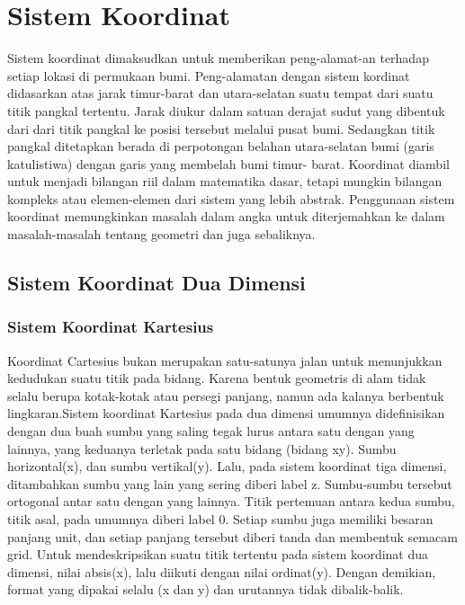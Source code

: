 \section{Sistem Koordinat}

Sistem koordinat dimaksudkan untuk memberikan peng-alamat-an terhadap setiap lokasi di permukaan bumi. Peng-alamatan dengan sistem kordinat didasarkan atas jarak timur-barat dan utara-selatan suatu tempat dari suatu titik pangkal tertentu. Jarak diukur dalam satuan derajat sudut yang dibentuk dari dari titik pangkal ke posisi tersebut melalui pusat bumi. Sedangkan titik pangkal ditetapkan berada di
perpotongan belahan utara-selatan bumi (garis katulistiwa) dengan garis yang membelah bumi timur- barat\cite{zuhdi2012sistem}. Koordinat diambil untuk menjadi bilangan riil dalam matematika dasar, tetapi mungkin bilangan kompleks atau elemen-elemen dari sistem yang lebih abstrak. Penggunaan sistem koordinat memungkinkan masalah dalam angka untuk diterjemahkan ke dalam masalah-masalah tentang geometri dan juga sebaliknya.

\subsection{Sistem Koordinat Dua Dimensi}
\subsubsection{Sistem Koordinat Kartesius}
Koordinat Cartesius bukan merupakan satu-satunya jalan untuk menunjukkan kedudukan suatu titik pada bidang. Karena bentuk geometris di alam tidak selalu berupa kotak-kotak atau persegi panjang, namun ada kalanya berbentuk lingkaran\cite{mufidah2015solusi}.Sistem koordinat Kartesius pada dua dimensi umumnya didefinisikan dengan dua buah sumbu yang saling tegak lurus antara satu dengan yang lainnya, yang keduanya terletak pada satu bidang (bidang xy). Sumbu horizontal(x), dan sumbu vertikal(y). Lalu, pada sistem koordinat tiga dimensi, ditambahkan sumbu yang lain yang sering diberi label z. Sumbu-sumbu tersebut ortogonal antar satu dengan yang lainnya. Titik pertemuan antara kedua sumbu, titik asal, pada umumnya diberi label 0. Setiap sumbu juga memiliki besaran panjang unit, dan setiap panjang tersebut diberi tanda dan membentuk semacam grid. Untuk mendeskripsikan suatu titik tertentu pada sistem koordinat dua dimensi, nilai absis(x), lalu diikuti dengan nilai ordinat(y). Dengan demikian, format yang dipakai selalu (x dan y) dan urutannya tidak dibalik-balik.


